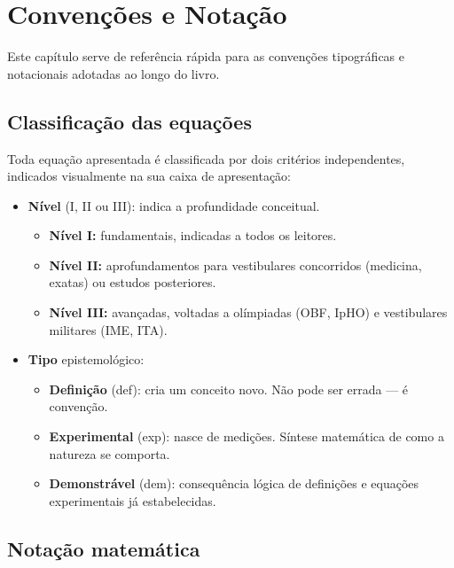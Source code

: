 
\chapter*{Convenções e Notação}

Este capítulo serve de referência rápida para as convenções tipográficas
e notacionais adotadas ao longo do livro.

\section*{Classificação das equações}

Toda equação apresentada é classificada por dois critérios independentes,
indicados visualmente na sua caixa de apresentação:

\begin{itemize}
  \item \textbf{Nível} (I, II ou III): indica a profundidade conceitual.
  \begin{itemize}
    \item \textbf{Nível I:} fundamentais, indicadas a todos os leitores.
    \item \textbf{Nível II:} aprofundamentos para vestibulares concorridos
    (medicina, exatas) ou estudos posteriores.
    \item \textbf{Nível III:} avançadas, voltadas a olímpiadas
    (OBF, IpHO) e vestibulares militares (IME, ITA).
  \end{itemize}

  \item \textbf{Tipo} epistemológico:
  \begin{itemize}
    \item \textbf{Definição} ({def}): cria um conceito novo. Não pode
    ser errada --- é convenção.
    \item \textbf{Experimental} ({exp}): nasce de medições. Síntese
    matemática de como a natureza se comporta.
    \item \textbf{Demonstrável} ({dem}): consequência lógica de
    definições e equações experimentais já estabelecidas.
  \end{itemize}
\end{itemize}

\section*{Notação matemática}

